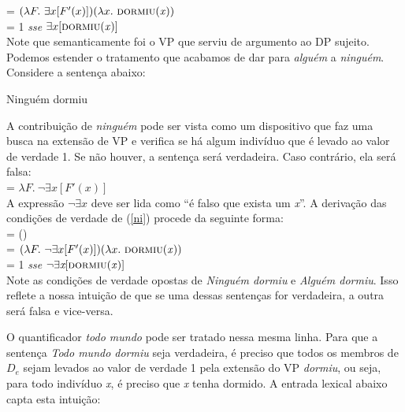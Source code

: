 \n = $(\lambda F.\ \exists x[F'(x)])(\lambda x.\ \text{\textsc{dormiu}(\textit{x})})$\\

\n = 1 \textit{sse} $\exists x[\text{\textsc{dormiu}(\textit{x})}]$\\

Note que semanticamente foi o VP que serviu de argumento ao DP sujeito. Podemos estender o tratamento que acabamos de dar para \textit{alguém} a
\textit{ninguém}. Considere a sentença abaixo:

\begin{exe}
    \ex Ninguém dormiu \label{ni}
\end{exe}

A contribuição de \textit{ninguém} pode ser vista como um dispositivo que
faz uma busca na extensão de VP e verifica se há algum indivíduo
que é levado ao valor de verdade 1. Se não houver, a sentença será
verdadeira. Caso contrário, ela será falsa:\\

\n {} = $\lambda F.\ \neg\exists
x [ F'(x)]$\\

\n A expressão \underline{$\neg\exists \textit{x}$} deve ser lida como ``é falso que exista um \textit{x}''. A derivação das condições de verdade de (\ref{ni}) procede da
seguinte forma:\\

\n {} =
()\\

\n = $(\lambda F.\ \neg\exists x[F'(x)])(\lambda x.\ \text{\textsc{dormiu}(\textit{x})})$\\

\n = 1 \textit{sse} $\neg\exists \textit{x}[\text{\textsc{dormiu}(\textit{x})}]$\\

\n Note as condições de verdade opostas de \textit{Ninguém dormiu} e
\textit{Alguém dormiu}. Isso reflete a nossa intuição de que se uma
dessas sentenças for verdadeira, a outra será falsa e vice-versa.

O quantificador \textit{todo mundo} pode ser tratado nessa mesma linha.
Para que a sentença \textit{Todo mundo dormiu} seja verdadeira, é preciso
que todos os membros de $D_{e}$ sejam levados ao valor de verdade 1
pela extensão do VP \textit{dormiu}, ou seja, para todo indivíduo
\textit{x}, é preciso que \textit{x} tenha dormido. A entrada
lexical abaixo capta esta intuição:\\

